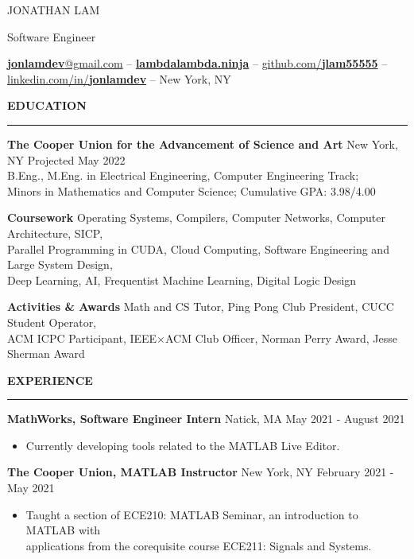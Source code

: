 \documentclass[]{article}
\newcommand{\br}{\vspace{10pt}}
\newcommand{\brs}{\vspace{3pt}}
\newcommand{\hr}{\vspace{4pt}\hrule\vspace{4pt}}
\begin{document}
\thispagestyle{empty}

{\LARGE JONATHAN LAM}

Software Engineer

\href{mailto:jonlamdev@gmail.com}{\textbf{jonlamdev}@gmail.com} --
\href{https://lambdalambda.ninja}{\textbf{lambdalambda.ninja}} --
\href{https://github.com/jlam55555}{github.com/\textbf{jlam55555}} --
\href{https://linkedin.com/in/jonlamdev}{linkedin.com/in/\textbf{jonlamdev}} --
New York, NY

\br
\textbf{EDUCATION}
\hr
\textbf{The Cooper Union for the Advancement of Science and Art}
New York, NY
\hfill
Projected May 2022\\
B.Eng., M.Eng. in Electrical Engineering, Computer Engineering Track;\\
Minors in Mathematics and Computer Science; Cumulative GPA: 3.98/4.00

\brs

\textbf{Coursework} Operating Systems, Compilers, Computer Networks, Computer
Architecture, SICP,\\
Parallel Programming in CUDA, Cloud Computing, Software Engineering and Large
System Design,\\
Deep Learning, AI, Frequentist Machine Learning, Digital Logic Design

\brs

\textbf{Activities \& Awards} Math and CS Tutor, Ping Pong Club President, CUCC
Student Operator, \\ ACM ICPC Participant, IEEE$\times$ACM Club Officer, Norman
Perry Award, Jesse Sherman Award

\br

\textbf{EXPERIENCE}
\hr

\textbf{MathWorks, Software Engineer Intern}
Natick, MA
\hfill
May 2021 - August 2021
\begin{itemize}
\item Currently developing tools related to the MATLAB Live Editor.
\end{itemize}

\brs

\textbf{The Cooper Union, MATLAB Instructor}
New York, NY
\hfill
February 2021 - May 2021
\begin{itemize}
\item Taught a section of ECE210: MATLAB Seminar, an introduction to MATLAB with
  \\ applications from the corequisite course ECE211: Signals and Systems.
\end{itemize}
\end{document}
